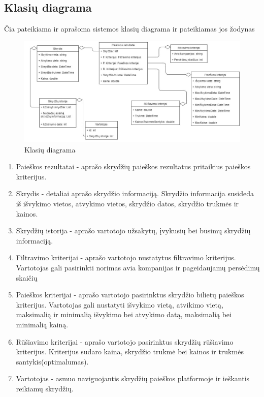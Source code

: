 \documentclass{VUMIFPSkursinis}
\begin{document}
            \subsection{Klasių diagrama}
            Čia pateikiama ir aprašoma sistemos klasių diagrama ir pateikiamas jos žodynas
                \begin{figure}[H]
                    \centering
                    \includegraphics[scale=0.5]{img/class_diagram}
                    \caption{Klasių diagrama}
                    \label{klasių diagrama}
                \end{figure}
                \begin{enumerate}[label=\textbf{E\arabic*}.]
                    \item Paieškos rezultatai - aprašo skrydžių paieškos rezultatus pritaikius paieškos kriterijus.
                    \item Skrydis - detaliai aprašo skrydžio informaciją. Skrydžio informacija susideda iš išvykimo vietos, atvykimo vietos, skrydžio datos, skrydžio trukmės ir kainos.
                    \item Skrydžių istorija - aprašo vartotojo užsakytų, įvykusių bei būsimų skrydžių informaciją.
                    \item Filtravimo kriterijai - aprašo vartotojo nustatytus filtravimo kriterijus. Vartotojas gali pasirinkti norimas avia kompanijas ir pageidaujamų persėdimų skaičių
                    \item Paieškos kriterijai - aprašo vartotojo pasirinktus skrydžio bilietų paieškos kriterijus. Vartotojas gali nustatyti išvykimo vietą, atvikimo vietą, maksimalią ir minimalią išvykimo bei atvykimo datą, maksimalią bei minimalią kainą.
                    \item Rūšiavimo kriterijai - aprašo vartotojo pasirinktus skrydžių rūšiavimo kriterijus. Kriterijus sudaro kaina, skrydžio trukmė bei kainos ir trukmės santykis(optimalumas).
                    \item Vartotojas - asmuo naviguojantis skrydžių paieškos platformoje ir ieškantis reikiamų skrydžių.
                \end{enumerate}
    
\end{document}
